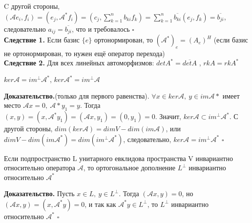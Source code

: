 C другой стороны, $(\mathcal Ae_i,f_i)=(e_j,\mathcal A^*f_i)=(c_j,
\sum\limits^n_{k=1}b_{ki}f_k)=\sum\limits^n_{k=1}\overline{b_{ki}}(e_j,f_k)=
\overline{b_{ji}}$, следовательно $a_{ij}=\overline{b_{ji}}$, что и требовалось
$\square$\\
\textbf{Следствие 1.} Если базис $\{e\}$ ортонормирован, то $(\mathcal A^*)_e=
(A_e)^H$ (если базис не ортонормирован, то нужен ещё оператор перехода)\\
\textbf{Следствие 2.} Для всех линейных автоморфизмов: $detA^*=\overline{detA}$
, $rkA=rkA^*$ 
\begin{theor}
$ker\mathcal A=im^\perp\mathcal A^*$, $ker\mathcal A^*=im^\perp\mathcal A$
\end{theor}
\textbf{Доказательство.}(только для первого равенства). $\forall x\in 
ker\mathcal A,~y\in im\mathcal A*$ имеет место $\mathcal Ax=0,~\mathcal
A*y_1=y$. Тогда $(x,y)=(x,\mathcal A^*y_1)=(\mathcal Ax,y_1)=(0,y_1)=0$.
Значит, $ker\mathcal A\subset im^\perp\mathcal A^*$. С
другой стороны, $dim(ker\mathcal A)=dimV-dim(im\mathcal A)$, или $dimV-
dim(im\mathcal A^*)=dim(im^\perp\mathcal A^*)$, следовательно, $ker\mathcal 
A=im^\perp \mathcal A^*$ $\square$
\begin{theor}
Если подпространство L унитарного евклидова пространства V инвариантно
относительно оператора $\mathcal A$, то ортогональное дополнение $L^\perp$ 
инвариантно относительно $\mathcal A^*$
\end{theor}
\textbf{Доказательство.} Пусть $x\in L,~y\in L^\perp$. Тогда 
$(\mathcal Ax,y)=0$, но $(\mathcal Ax,y)=(x,\mathcal A^*y)=0$, и так как
$\mathcal A^*y\in L^\perp$, то $L^\perp$ инвариантно относительно
$\mathcal A^*$ $\square$
